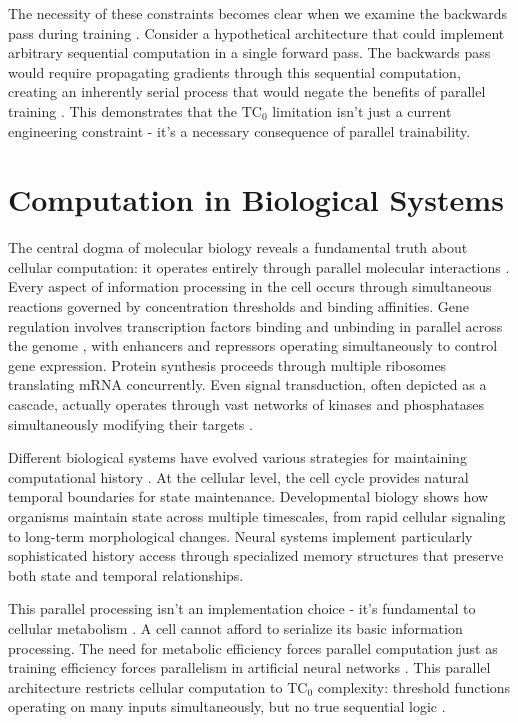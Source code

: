 \documentclass[12pt]{article}
\begin{document}
The necessity of these constraints becomes clear when we examine the backwards pass during training \cite{jung2020new}. Consider a hypothetical architecture that could implement arbitrary sequential computation in a single forward pass. The backwards pass would require propagating gradients through this sequential computation, creating an inherently serial process that would negate the benefits of parallel training \cite{zhu2024overcoming}. This demonstrates that the $\text{TC}_0$ limitation isn't just a current engineering constraint - it's a necessary consequence of parallel trainability.

\section{Computation in Biological Systems}

The central dogma of molecular biology reveals a fundamental truth about cellular computation: it operates entirely through parallel molecular interactions \cite{wang2023parallel,cai2024efficient,fu2023scgrn}. Every aspect of information processing in the cell occurs through simultaneous reactions governed by concentration thresholds and binding affinities. Gene regulation involves transcription factors binding and unbinding in parallel across the genome \cite{niu2022computational,berridge2014cell}, with enhancers and repressors operating simultaneously to control gene expression. Protein synthesis proceeds through multiple ribosomes translating mRNA concurrently. Even signal transduction, often depicted as a cascade, actually operates through vast networks of kinases and phosphatases simultaneously modifying their targets \cite{pastor2020computation}.

Different biological systems have evolved various strategies for maintaining computational history \cite{espinosa2024molecular}. At the cellular level, the cell cycle provides natural temporal boundaries for state maintenance. Developmental biology shows how organisms maintain state across multiple timescales, from rapid cellular signaling to long-term morphological changes. Neural systems implement particularly sophisticated history access through specialized memory structures that preserve both state and temporal relationships.

This parallel processing isn't an implementation choice - it's fundamental to cellular metabolism \cite{cai2024efficient,hoel2020emergence}. A cell cannot afford to serialize its basic information processing. The need for metabolic efficiency forces parallel computation just as training efficiency forces parallelism in artificial neural networks \cite{barrett2019analyzing}. This parallel architecture restricts cellular computation to $\text{TC}_0$ complexity: threshold functions operating on many inputs simultaneously, but no true sequential logic \cite{wang2023parallel}.
\end{document}
